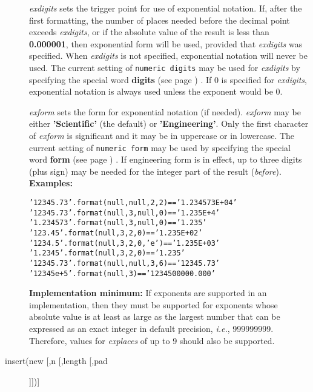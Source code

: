 \begin{description}
\emph{exdigits} sets the trigger point for use of exponential
notation.
If, after the first formatting, the number of places needed before the
decimal point exceeds \emph{exdigits}, or if the absolute value of
the result is less than \textbf{0.000001}, then exponential form will
be used, provided that \emph{exdigits} was specified.
When \emph{exdigits} is not specified, exponential notation
will never be used.
The current setting of \texttt{numeric digits} may be used for
\emph{exdigits} by specifying the special word
 \textbf{digits} (see page \pageref{refswdigit}) .
If 0 is specified for \emph{exdigits}, exponential
notation is always used unless the exponent would be 0.
 
\emph{exform} sets the form for exponential notation (if needed).
\emph{exform} may be either \textbf{'Scientific'} (the default)
or \textbf{'Engineering'}.  Only the first character of
\emph{exform} is significant and it may be in uppercase or in
lowercase.
The current setting of \texttt{numeric form} may be used by specifying
the special word  \textbf{form} (see page \pageref{refswform}) .
If engineering form is in effect, up to three digits (plus sign) may be
needed for the integer part of the result (\emph{before}).
 \textbf{Examples:}
\begin{alltt}
'12345.73'.format(null,null,2,2) == '1.234573E+04'
'12345.73'.format(null,3,null,0) == '1.235E+4'
'1.234573'.format(null,3,null,0) == '1.235'
'123.45'.format(null,3,2,0)      == '1.235E+02'
'1234.5'.format(null,3,2,0,'e')  == '1.235E+03'
'1.2345'.format(null,3,2,0)      == '1.235    '
'12345.73'.format(null,null,3,6) == '12345.73     '
'12345e+5'.format(null,3)        == '1234500000.000'
\end{alltt}
 \textbf{Implementation minimum:} If exponents are supported in an
implementation, then they must be supported for exponents whose
absolute value is at least as large as the largest number that can be
expressed as an exact integer in default precision, \emph{i.e.}, 999999999.
Therefore, values for \emph{explaces} of up to 9 should also be
supported.
\item[insert(new [,n [,length [,pad]]])]\label{refinsert}


\end{description}
